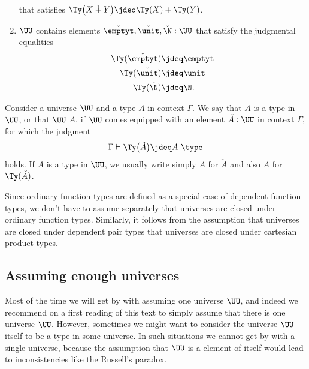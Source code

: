 \begin{defn}
\begin{enumerate}
\begin{equation*}
    \end{equation*}
    that satisfies $\Ty\big(X\mathbin{\check{+}}Y\big)\jdeq \Ty(X)+\Ty(Y)$.
  \item $\UU$ contains elements $\check{\emptyt},\check{\unit},\check{\N}:\UU$
    that satisfy the judgmental equalities
    \begin{align*}
      \Ty(\check{\emptyt}) & \jdeq \emptyt \\
      \Ty(\check{\unit}) & \jdeq \unit \\
      \Ty(\check{\N}) & \jdeq \N.
    \end{align*}
  \end{enumerate}
  Consider a universe $\UU$ and a type $A$ in context $\Gamma$. We say that $A$ is a type in $\UU$, or that $\UU$  $A$, if $\UU$ comes equipped with an element $\check{A}:\UU$ in context $\Gamma$, for which the judgment
  \begin{equation*}
    \Gamma\vdash\Ty\big(\check{A}\big)\jdeq A~\type
  \end{equation*}
  holds. If $A$ is a type in $\UU$, we usually write simply $A$ for $\check{A}$ and also $A$ for $\Ty(\check{A})$.
\end{defn}

\begin{rmk}
  Since ordinary function types are defined as a special case of dependent function types, we don't have to assume separately that universes are closed under ordinary function types. Similarly, it follows from the assumption that universes are closed under dependent pair types that universes are closed under cartesian product types.
\end{rmk}

\subsection{Assuming enough universes}

  Most of the time we will get by with assuming one universe $\UU$, and indeed we recommend on a first reading of this text to simply assume that there is one universe $\UU$. However, sometimes we might want to consider the universe $\UU$ itself to be a type in some universe. In such situations we cannot get by with a single universe, because the assumption that $\UU$ is a element of itself would lead to inconsistencies like the Russell's paradox.


